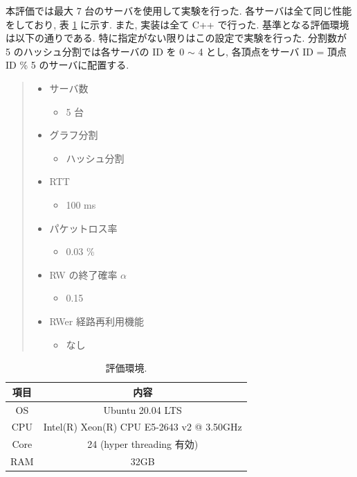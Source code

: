 本評価では最大 7 台のサーバを使用して実験を行った. 各サーバは全て同じ性能をしており, 表 \ref{評価環境} に示す. また, 実装は全て C++ で行った. 基準となる評価環境は以下の通りである. 特に指定がない限りはこの設定で実験を行った. 分割数が 5 のハッシュ分割では各サーバの ID を 0 $\sim$ 4 とし, 各頂点をサーバ ID = 頂点 ID \% 5 のサーバに配置する.
\begin{quote}
    \begin{itemize}
        \item サーバ数
        \begin{itemize}
            \item 5 台
        \end{itemize}
        \item グラフ分割
        \begin{itemize}
            \item ハッシュ分割
        \end{itemize}
        \item RTT
        \begin{itemize}
            \item 100 ms
        \end{itemize}
        \item パケットロス率
        \begin{itemize}
            \item 0.03 \%
        \end{itemize}
        \item RW の終了確率 $\alpha$
        \begin{itemize}
            \item 0.15
        \end{itemize}
        \item RWer 経路再利用機能
        \begin{itemize}
            \item なし
        \end{itemize}
    \end{itemize}
\end{quote}

\begin{table}[t]
    \caption{評価環境.}
    \label{評価環境}
    \centering
    \begin{tabular}{c|c}
      \hline
      項目 & 内容   \\
      \hline \hline
      OS  & Ubuntu 20.04 LTS \\
      CPU  & Intel(R) Xeon(R) CPU E5-2643 v2 @ 3.50GHz  \\
      Core & 24 (hyper threading 有効) \\
      RAM  & 32GB \\
      \hline
    \end{tabular}
\end{table}

